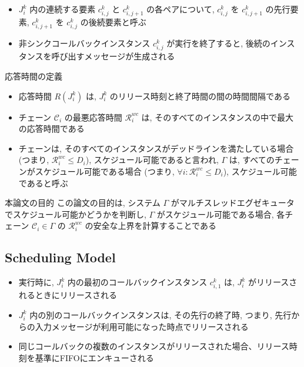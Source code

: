 \begin{frame}{}
    \begin{itemize}
        \item $J_{i}^{k}$ 内の連続する要素 $c_{i, j}^{k}$ と $c_{i, j+1}^{k}$ の各ペアについて, $c_{i, j}^{k}$ を $c_{i, j+1}^{k}$ の先行要素, $c_{i, j+1}^{k}$ を $c_{i, j}^{k}$ の後続要素と呼ぶ
        \item 非シンクコールバックインスタンス $c_{i, j}^{k}$ が実行を終了すると, 後続のインスタンスを呼び出すメッセージが生成される
    \end{itemize}
\end{frame}

\begin{frame}{応答時間の定義}
    \begin{itemize}
        \item 応答時間 $R\left(J_{i}^{k}\right)$ は,  $J_{i}^{k}$ のリリース時刻と終了時間の間の時間間隔である
        \item チェーン $\mathcal{C}_{i}$ の最悪応答時間 $\mathcal{R}_{i}^{w c}$ は, そのすべてのインスタンスの中で最大の応答時間である
        \item チェーンは, そのすべてのインスタンスがデッドラインを満たしている場合 (つまり, $\mathcal{R}_{i}^{w c} \leq D_{i}$), スケジュール可能であると言われ, $\Gamma$ は, すべてのチェーンがスケジュール可能である場合 (つまり, $\forall i: \mathcal{R}_{i}^{w c} \leq D_{i}$), スケジュール可能であると呼ぶ
    \end{itemize}
\end{frame}

\begin{frame}{本論文の目的}
    この論文の目的は, システム $\Gamma$ がマルチスレッドエグゼキュータでスケジュール可能かどうかを判断し, $\Gamma$ がスケジュール可能である場合, 各チェーン $\mathcal{C}_{i} \in \Gamma$ の $\mathcal{R}_{i}^{w c}$ の安全な上界を計算することである
\end{frame}


\subsection{Scheduling Model}
\label{ssec: scheduling_model}


\begin{frame}{}
    \begin{itemize}
        \item 実行時に, $J_{i}^{k}$ 内の最初のコールバックインスタンス $c_{i, 1}^{k}$ は, $J_{i}^{k}$ がリリースされるときにリリースされる
        \item $J_{i}^{k}$ 内の別のコールバックインスタンスは, その先行の終了時, つまり, 先行からの入力メッセージが利用可能になった時点でリリースされる
        \item 同じコールバックの複数のインスタンスがリリースされた場合、リリース時刻を基準にFIFOにエンキューされる
    \end{itemize}
\end{frame}

